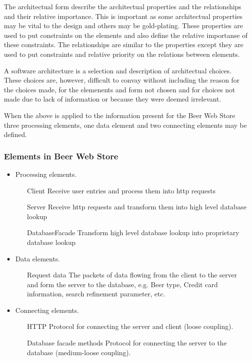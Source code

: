 The architectual form describe the architectual properties and the relationships and their relative importance. This is important as some architectual properties
may be vital to the design and others may be gold-plating. These properties are used to put constraints on the elements and also define the relative importanse of these constraints. The relationships are similar to the properties except they are used to put constraints and relative priority on the relations between elements.

A software architecture is a selection and description of architectual choices. These choices are, however, difficult to convay without including the reason for the choices made, for the elemenents and form not chosen and for choices not made due to lack of information or because they were deemed irrelevant.

When the above is applied to the information present for the Beer Web Store three processing elements, one data element and two connecting elements may be defined.

\subsubsection{Elements in Beer Web Store}

\begin{itemize}
    \item Processing elements.
	 \begin{itemize}
	    \item[Client] Receive user entries and process them into http requests
	    \item[Server] Receive http requests and transform them into high level database lookup
	    \item[DatabaseFacade] Transform high level database lookup into proprietary database lookup
	 \end{itemize}
    \item Data elements.
	 \begin{itemize}
	    \item[Request data] The packets of data flowing from the client to the server and form the server to the database, e.g. Beer type, Credit card information, search refinement parameter, etc.
	 \end{itemize}
    \item Connecting elements.
	 \begin{itemize}
	    \item[HTTP] Protocol for connecting the server and client (loose coupling).
	    \item[Database facade methods] Protocol for connecting the server to the database (medium-loose coupling).
	 \end{itemize}
\end{itemize}

